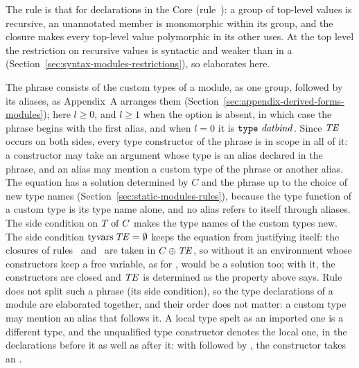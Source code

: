 \begin{rulecomments}
 The rule is that for declarations in the Core
(rule~): a group of top-level values is recursive, an
unannotated member is monomorphic within its group, and the closure makes every
top-level value polymorphic in its other uses. %
At the top level the restriction on recursive values is syntactic and weaker
than in a  (Section~\ref{sec:syntax-modules-restrictions}), so
 elaborates here. %

 The phrase consists of the custom types of a
module, as one group, followed by its aliases, as Appendix~A arranges them
(Section~\ref{sec:appendix-derived-forms-modules}); here $l \geq 0$, and $l
\geq 1$ when the option is absent, in which case the phrase begins with the
first alias, and when $l = 0$ it is $\textnormal{\texttt{type}}\ \mathit{datbind}$. Since $\mathit{TE}$ occurs
on both sides, every type constructor of the phrase is in scope in all of it: a
constructor may take an argument whose type is an alias declared in the
phrase, and an alias may mention a custom type of the phrase or another alias.
The equation has a solution determined by $C$ and the phrase up to the choice
of new type names (Section~\ref{sec:static-modules-rules}), because the type
function of a custom type is its type name alone, and no alias refers to itself
through aliases. The side condition on $T \mathrel{\mathrm{of}} C$ makes the type names of the
custom types new. The side condition $\mathrm{tyvars}\,\mathit{TE} = \emptyset$ keeps the
equation from justifying itself: the closures of rules~
and~ are taken in $C \oplus \mathit{TE}$, so without it an
environment whose constructors keep a free variable, as  for
, would be a solution too; with it, the constructors are
closed and $\mathit{TE}$ is determined as the property above says. %
Rule~ does not split such a
phrase (its side condition), so the type declarations of a module are
elaborated together, and their order does not matter: a custom type may
mention an alias that follows it. A local type spelt as an imported one is
a different type, and the unqualified type constructor denotes the local one,
in the declarations before it as well as after it: with 
followed by , the constructor  takes an
. %


\end{rulecomments}
